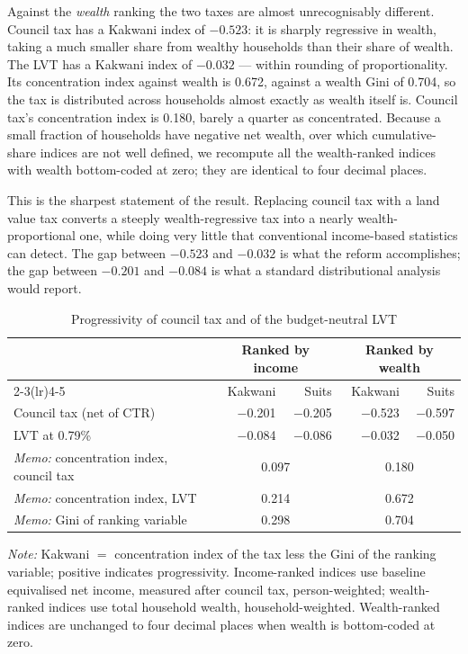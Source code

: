 Against the \emph{wealth} ranking the two taxes are almost unrecognisably different. Council tax has a Kakwani index of $-0.523$: it is sharply regressive in wealth, taking a much smaller share from wealthy households than their share of wealth. The LVT has a Kakwani index of $-0.032$ --- within rounding of proportionality. Its concentration index against wealth is 0.672, against a wealth Gini of 0.704, so the tax is distributed across households almost exactly as wealth itself is. Council tax's concentration index is 0.180, barely a quarter as concentrated. Because a small fraction of households have negative net wealth, over which cumulative-share indices are not well defined, we recompute all the wealth-ranked indices with wealth bottom-coded at zero; they are identical to four decimal places.

This is the sharpest statement of the result. Replacing council tax with a land value tax converts a steeply wealth-regressive tax into a nearly wealth-proportional one, while doing very little that conventional income-based statistics can detect. The gap between $-0.523$ and $-0.032$ is what the reform accomplishes; the gap between $-0.201$ and $-0.084$ is what a standard distributional analysis would report.

\begin{table}[htbp]
\centering
\caption{Progressivity of council tax and of the budget-neutral LVT}
\label{tab:progressivity}
\begin{tabular}{lrrrr}
\toprule
 & \multicolumn{2}{c}{Ranked by income} & \multicolumn{2}{c}{Ranked by wealth} \\
\cmidrule(lr){2-3}\cmidrule(lr){4-5}
 & Kakwani & Suits & Kakwani & Suits \\
\midrule
Council tax (net of CTR) & $-$0.201 & $-$0.205 & $-$0.523 & $-$0.597 \\
LVT at 0.79\%            & $-$0.084 & $-$0.086 & $-$0.032 & $-$0.050 \\
\midrule
\emph{Memo:} concentration index, council tax & \multicolumn{2}{c}{0.097} & \multicolumn{2}{c}{0.180} \\
\emph{Memo:} concentration index, LVT         & \multicolumn{2}{c}{0.214} & \multicolumn{2}{c}{0.672} \\
\emph{Memo:} Gini of ranking variable         & \multicolumn{2}{c}{0.298} & \multicolumn{2}{c}{0.704} \\
\bottomrule
\end{tabular}

\medskip
{\footnotesize\emph{Note:} Kakwani $=$ concentration index of the tax less the Gini of the ranking variable; positive indicates progressivity. Income-ranked indices use baseline equivalised net income, measured after council tax, person-weighted; wealth-ranked indices use total household wealth, household-weighted. Wealth-ranked indices are unchanged to four decimal places when wealth is bottom-coded at zero.}
\end{table}


